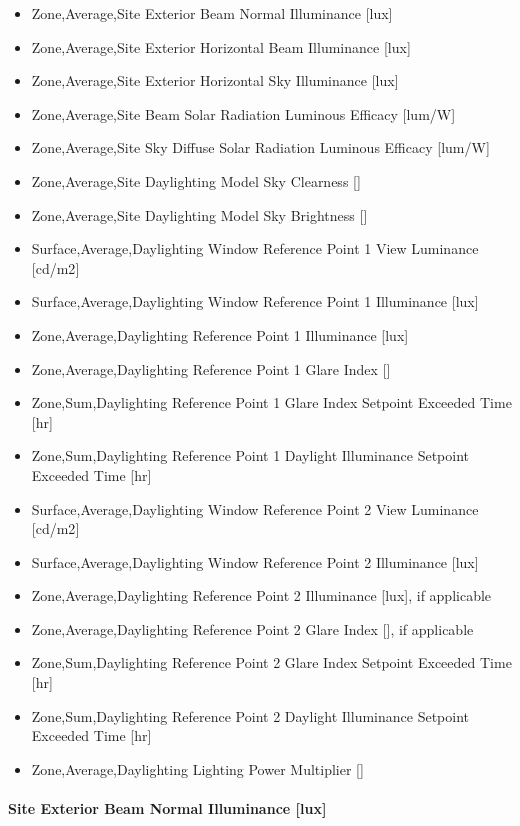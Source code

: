 \begin{itemize}
\item
  Zone,Average,Site Exterior Beam Normal Illuminance {[}lux{]}
\item
  Zone,Average,Site Exterior Horizontal Beam Illuminance {[}lux{]}
\item
  Zone,Average,Site Exterior Horizontal Sky Illuminance {[}lux{]}
\item
  Zone,Average,Site Beam Solar Radiation Luminous Efficacy {[}lum/W{]}
\item
  Zone,Average,Site Sky Diffuse Solar Radiation Luminous Efficacy {[}lum/W{]}
\item
  Zone,Average,Site Daylighting Model Sky Clearness {[]}
\item
  Zone,Average,Site Daylighting Model Sky Brightness {[]}
\item
  Surface,Average,Daylighting Window Reference Point 1 View Luminance {[}cd/m2{]}
\item
  Surface,Average,Daylighting Window Reference Point 1 Illuminance {[}lux{]}
\item
  Zone,Average,Daylighting Reference Point 1 Illuminance {[}lux{]}
\item
  Zone,Average,Daylighting Reference Point 1 Glare Index {[]}
\item
  Zone,Sum,Daylighting Reference Point 1 Glare Index Setpoint Exceeded Time {[}hr{]}
\item
  Zone,Sum,Daylighting Reference Point 1 Daylight Illuminance Setpoint Exceeded Time {[}hr{]}
\item
  Surface,Average,Daylighting Window Reference Point 2 View Luminance {[}cd/m2{]}
\item
  Surface,Average,Daylighting Window Reference Point 2 Illuminance {[}lux{]}
\item
  Zone,Average,Daylighting Reference Point 2 Illuminance {[}lux{]}, if applicable
\item
  Zone,Average,Daylighting Reference Point 2 Glare Index {[]}, if applicable
\item
  Zone,Sum,Daylighting Reference Point 2 Glare Index Setpoint Exceeded Time {[}hr{]}
\item
  Zone,Sum,Daylighting Reference Point 2 Daylight Illuminance Setpoint Exceeded Time {[}hr{]}
\item
  Zone,Average,Daylighting Lighting Power Multiplier {[]}
\end{itemize}

\paragraph{Site Exterior Beam Normal Illuminance {[}lux{]}}\label{site-exterior-beam-normal-illuminance-lux}

